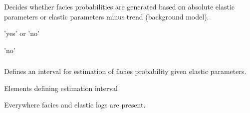 \subsubsection{}  
 \slist
   \item \Description Decides whether facies probabilities are
     generated based on absolute elastic parameters or elastic
     parameters minus trend (background model).
   \item \Argument 'yes' or 'no'
   \item \Default 'no'
 \elist

\subsubsection{}
 \slist
   \item \Description Defines an interval for estimation of facies probability given elastic parameters.
   \item \Argument Elements defining estimation interval
   \item \Default Everywhere facies and elastic logs are present.
 \elist

